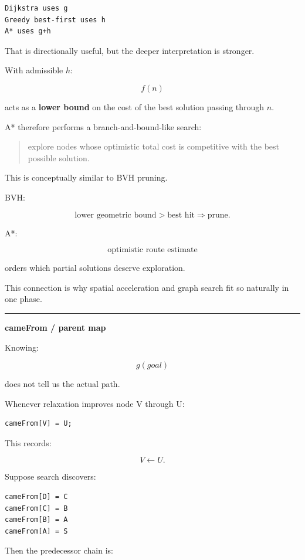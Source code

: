 \begin{verbatim}
Dijkstra uses g
Greedy best-first uses h
A* uses g+h
\end{verbatim}

That is directionally useful, but the deeper interpretation is stronger.

With admissible \(h\):

\[
f(n)
\]

acts as a \textbf{lower bound} on the cost of the best solution passing through \(n\).

A* therefore performs a branch-and-bound-like search:

\begin{quote}
explore nodes whose optimistic total cost is competitive with the best possible solution.
\end{quote}

This is conceptually similar to BVH pruning.

BVH:

\[
\text{lower geometric bound}>
\text{best hit}
\Rightarrow
\text{prune}.
\]

A*:

\[
\text{optimistic route estimate}
\]

orders which partial solutions deserve exploration.

This connection is why spatial acceleration and graph search fit so naturally in one phase.

\begin{center}\rule{0.5\linewidth}{0.5pt}\end{center}

\textbf{cameFrom / parent map}

Knowing:

\[
g(goal)
\]

does not tell us the actual path.

Whenever relaxation improves node V through U:

\begin{verbatim}
cameFrom[V] = U;
\end{verbatim}

This records:

\[
V\leftarrow U.
\]

Suppose search discovers:

\begin{verbatim}
cameFrom[D] = C
cameFrom[C] = B
cameFrom[B] = A
cameFrom[A] = S
\end{verbatim}

Then the predecessor chain is:

